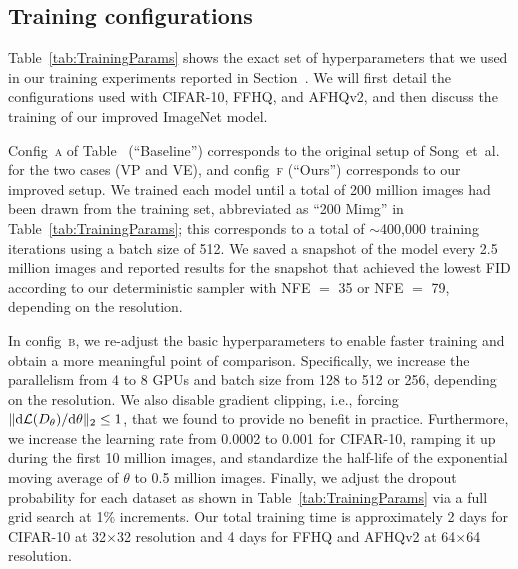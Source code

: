 \subsection{Training configurations}
\label{app:training}

\tabTrainingParams

Table~\ref{tab:TrainingParams} shows the exact set of hyperparameters that we used in our training experiments reported in {Section~}.
{We will first detail the configurations used with CIFAR-10, FFHQ, and AFHQv2, and then discuss the training of our improved ImageNet model.}

Config~\textsc{a} {of Table~ (``Baseline'')} corresponds to the original setup of Song~et~al.~\cite{Song2021sde} for the two {cases} (VP and VE), and config~\textsc{f} {(``Ours'')} corresponds to our improved setup.
We trained each model until a total of 200 million images had been drawn from the training set, abbreviated as ``200 Mimg'' in Table~\ref{tab:TrainingParams}; this corresponds to a total of $\sim$400,000 training iterations using a batch size of 512.
We saved a snapshot of the model every 2.5 million images and reported results for the snapshot that achieved the lowest FID according to our deterministic sampler with NFE $=$ 35 or NFE $=$ 79, depending on the resolution.

In config~\textsc{b}, we re-adjust the basic hyperparameters to enable faster training and obtain a more meaningful point of comparison.
Specifically, we increase the parallelism from 4 to 8 GPUs and batch size from 128 to 512 or 256, depending on the resolution.
We also disable gradient clipping, i.e., forcing $\lVert \mathrm{d}\mathcal{L}(D_\theta) / \mathrm{d}\theta \rVert_2 \le 1$, that we found to provide no benefit in practice.
Furthermore, we increase the learning rate from 0.0002 to 0.001 for CIFAR-10, ramping it up during the first 10 million images, and standardize the half-life of the exponential moving average of $\theta$ to 0.5 million images.
Finally, we adjust the dropout probability for each dataset as shown in Table~\ref{tab:TrainingParams} via a full grid search at 1\% increments.
Our total training time is approximately 2 days {for CIFAR-10} at 32$\times$32 resolution and 4 days {for FFHQ and AFHQv2} at 64$\times$64 resolution.

